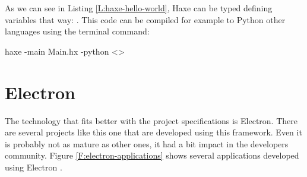 \begin{codefigure}
\end{codefigure}

As we can see in Listing \ref{L:haxe-hello-world}, Haxe can be typed defining 
variables that way: . This code can be compiled
for example to Python other languages using the terminal command:

\begin{bashcode}
	haxe -main Main.hx -python \textless{}\textgreater
\end{bashcode}

\section{Electron}

The technology that fits better with the project specifications is Electron. 
There are several projects like this one that are developed using this 
framework. Even it is probably not as mature as other ones, it had a bit impact in the
developers community. Figure \ref{F:electron-applications} shows several
applications developed using Electron \cite{electron-web}.

